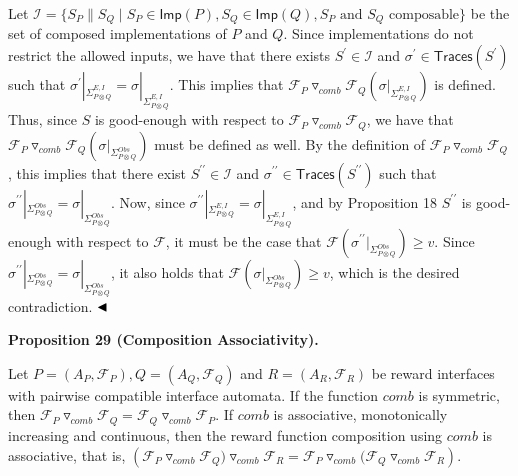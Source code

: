  
 
Let $\mathcal{I}=\{S_{P}\parallel S_{Q}\mid S_{P}\in\mathsf{Imp}(P),S_{Q}\in\mathsf{Imp}(Q),S_{P}\text{ and }S_{Q}\text{ composable}\}$ be the set of composed implementations of $P$ and $Q$. Since implementations do not restrict the allowed inputs, we have that there exists $S^{\prime}\in\mathcal{I}$ and $\sigma^{\prime}\in\mathsf{Traces}(S^{\prime})$ such that $\sigma^{\prime}|_{\Sigma_{P\otimes Q}^{E,I}}=\sigma|_{\Sigma_{P\otimes Q}^{E,I}}$. This implies that ${{\mathcal{F}_{P}}\mathbin{\triangledown_{\mathit{comb}}}{\mathcal{F}_{Q}}}(\sigma|_{\Sigma_{P\otimes Q}^{E,I}})$ is defined. Thus, since $S$ is good-enough with respect to ${{\mathcal{F}_{P}}\mathbin{\triangledown_{\mathit{comb}}}{\mathcal{F}_{Q}}}$, we have that ${{\mathcal{F}_{P}}\mathbin{\triangledown_{\mathit{comb}}}{\mathcal{F}_{Q}}}(\sigma|_{\Sigma_{P\otimes Q}^{Obs}})$ must be defined as well. By the definition of ${{\mathcal{F}_{P}}\mathbin{\triangledown_{\mathit{comb}}}{\mathcal{F}_{Q}}}$, this implies that there exist $S^{\prime\prime}\in\mathcal{I}$ and $\sigma^{\prime\prime}\in\mathsf{Traces}(S^{\prime\prime})$ such that $\sigma^{\prime\prime}|_{\Sigma_{P\otimes Q}^{Obs}}=\sigma|_{\Sigma_{P\otimes Q}^{Obs}}$. Now, since $\sigma^{\prime\prime}|_{\Sigma_{P\otimes Q}^{E,I}}=\sigma|_{\Sigma_{P\otimes Q}^{E,I}}$, and by Proposition 18 $S^{\prime\prime}$ is good-enough with respect to $\mathcal{F}$, it must be the case that $\mathcal{F}(\sigma^{\prime\prime}|_{\Sigma_{P\otimes Q}^{Obs}})\geq v$. Since $\sigma^{\prime\prime}|_{\Sigma_{P\otimes Q}^{Obs}}=\sigma|_{\Sigma_{P\otimes Q}^{Obs}}$, it also holds that $\mathcal{F}(\sigma|_{\Sigma_{P\otimes Q}^{Obs}})\geq v$, which is the desired contradiction. $\hfill\blacktriangleleft$\par
 
 
 
\par\medskip\noindent\textbf{Proposition 29 (Composition Associativity).}\par
 
 
Let $P=(A_{P},\mathcal{F}_{P}),Q=(A_{Q},\mathcal{F}_{Q})$ and $R=(A_{R},\mathcal{F}_{R})$ be reward interfaces with pairwise compatible interface automata. If the function $\mathit{comb}$ is symmetric, then ${{\mathcal{F}_{P}}\mathbin{\triangledown_{\mathit{comb}}}{\mathcal{F}_{Q}}}={{\mathcal{F}_{Q}}\mathbin{\triangledown_{\mathit{comb}}}{\mathcal{F}_{P}}}$. If $\mathit{comb}$ is associative, monotonically increasing and continuous, then the reward function composition using $\mathit{comb}$ is associative, that is, $({{{{\mathcal{F}_{P}}\mathbin{\triangledown_{\mathit{comb}}}{\mathcal{F}_{Q})}}}\mathbin{\triangledown_{\mathit{comb}}}{\mathcal{F}_{R}}}={{\mathcal{F}_{P}}\mathbin{\triangledown_{\mathit{comb}}}{{{(\mathcal{F}_{Q}}\mathbin{\triangledown_{\mathit{comb}}}{\mathcal{F}_{R}}}}})$.\par
 
